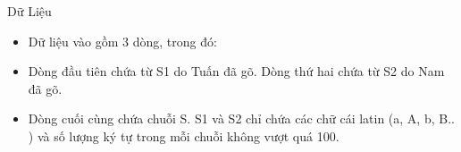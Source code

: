 Dữ Liệu  
\begin{itemize}
	\item     Dữ liệu vào gồm 3 dòng, trong đó:   
	\item     Dòng đầu tiên chứa từ S1 do Tuấn đã gõ. Dòng thứ hai chứa từ S2 do Nam đã gõ.   
	\item     Dòng cuối cùng chứa chuỗi S. S1 và S2 chỉ chứa các chữ cái latin (a, A, b, B.. ) và số lượng ký tự trong mỗi chuỗi không vượt quá 100.   
\end{itemize}